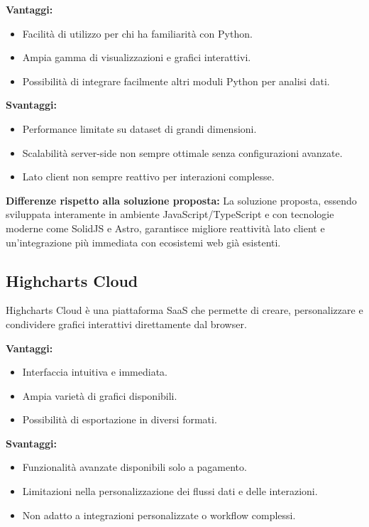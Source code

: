 \textbf{Vantaggi:}
\begin{itemize}
    \item Facilità di utilizzo per chi ha familiarità con Python.
    \item Ampia gamma di visualizzazioni e grafici interattivi.
    \item Possibilità di integrare facilmente altri moduli Python per analisi dati.
\end{itemize}

\textbf{Svantaggi:}
\begin{itemize}
    \item Performance limitate su dataset di grandi dimensioni.
    \item Scalabilità server-side non sempre ottimale senza configurazioni avanzate.
    \item Lato client non sempre reattivo per interazioni complesse.
\end{itemize}

\textbf{Differenze rispetto alla soluzione proposta:}
La soluzione proposta, essendo sviluppata interamente in ambiente JavaScript/TypeScript e con tecnologie moderne come SolidJS e Astro, garantisce migliore reattività lato client e un’integrazione più immediata con ecosistemi web già esistenti.

\subsection{Highcharts Cloud}

Highcharts Cloud è una piattaforma SaaS che permette di creare, personalizzare e condividere grafici interattivi direttamente dal browser.

\textbf{Vantaggi:}
\begin{itemize}
    \item Interfaccia intuitiva e immediata.
    \item Ampia varietà di grafici disponibili.
    \item Possibilità di esportazione in diversi formati.
\end{itemize}

\textbf{Svantaggi:}
\begin{itemize}
    \item Funzionalità avanzate disponibili solo a pagamento.
    \item Limitazioni nella personalizzazione dei flussi dati e delle interazioni.
    \item Non adatto a integrazioni personalizzate o workflow complessi.
\end{itemize}

